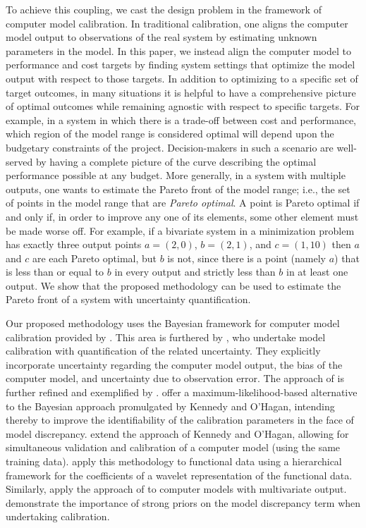\documentclass[12pt]{article}
\begin{document}
To achieve this coupling, we cast the design problem in the framework of computer model calibration.
%
In traditional calibration, one aligns the computer model output to observations of the real system by estimating unknown parameters in the model.
%
In this paper, we instead align the computer model to performance and cost targets by finding system settings that optimize the model output with respect to those targets.
%
In addition to optimizing to a specific set of target outcomes, in many situations it is helpful to have a comprehensive picture of optimal outcomes while remaining agnostic with respect to specific targets.
%
For example, in a system in which there is a trade-off between cost and performance, which region of the model range is considered optimal will depend upon the budgetary constraints of the project.
%
Decision-makers in such a scenario are well-served by having a complete picture of the curve describing the optimal performance possible at any budget.
%
More generally, in a system with multiple outputs, one wants to estimate the Pareto front of the model range; i.e., the set of points in the model range that are {\em Pareto optimal}.
%
A point is Pareto optimal if and only if, in order to improve any one of its elements, some other element must be made worse off.
%
For example, if a bivariate system in a minimization problem has exactly three output points $a=(2,0)$, $b=(2,1)$, and $c=(1,10)$ then $a$ and $c$ are each Pareto optimal, but $b$ is not, since there is a point (namely $a$) that is less than or equal to $b$ in every output and strictly less than $b$ in at least one output.
%
We show that the proposed methodology can be used to estimate the Pareto front of a system with uncertainty quantification. 
%

Our proposed methodology uses the Bayesian framework for computer model calibration provided by  \cite{Kennedy2001}.
% 
This area is furthered by \cite{Higdon2004}, who undertake model calibration with quantification of the related uncertainty. 
They explicitly incorporate uncertainty regarding the computer model output, the bias of the computer model, and uncertainty due to observation error. 
%
The approach of \cite{Higdon2004} is further refined and exemplified by \cite{Williams2006}.
%
\cite{Loeppky2006} offer a maximum-likelihood-based alternative to the Bayesian approach promulgated by Kennedy and O'Hagan, intending thereby to improve the identifiability of the calibration parameters in the face of model discrepancy. 
%
\cite{Bayarri2007} extend the approach of Kennedy and O'Hagan, allowing for simultaneous validation and calibration of a computer model (using the same training data). 
%
\cite{Bayarri} apply this methodology to functional data using a hierarchical framework for the coefficients of a wavelet representation of the functional data. 
%
Similarly, \cite{Paulo2012} apply the approach of \cite{Bayarri2007} to computer models with multivariate output.
%
\cite{Brynjarsdottir2014} demonstrate the importance of strong priors on the model discrepancy term when undertaking calibration.
\end{document}
